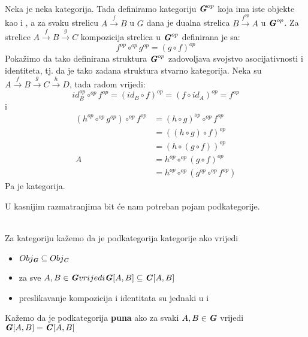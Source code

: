 	\begin{example}\ \\
	
    \noindent Neka je  neka kategorija. Tada definiramo kategoriju $\textbf{\emph{G}}^{op}$ koja ima
    iste objekte kao i , a za svaku strelicu $A \xrightarrow{f} B$ u $G$ 
    dana je dualna strelica $B \xrightarrow{f^{op}} A$ u $\textbf{\emph{G}}^{op}$.
    Za strelice $A \xrightarrow{f} B \xrightarrow{g} C$ kompozicija strelica
    u $\textbf{\emph{G}}^{op}$ definirana je sa:
    \begin{equation*}
      f^{op} \circ^{op} g^{op} = (g \circ f)^{op}
    \end{equation*}
    Pokažimo da tako definirana struktura $\textbf{\emph{G}}^{op}$ zadovoljava svojstvo
    asocijativnosti i identiteta, tj. da je tako zadana struktura stvarno
    kategorija.
    Neka su $A \xrightarrow{f} B \xrightarrow{g} C \xrightarrow{h} D$, tada radom vrijedi:
    \begin{equation*}
      id^{op}_B \circ^{op} f^{op} = (id_B \circ f)^{op} = (f \circ id_A)^{op} =
      f^{op}
    \end{equation*}
    i
    \begin{align*}
      (h^{op} \circ^{op} g^{op}) \circ^{op} f^{op} &= (h \circ g)^{op} \circ^{op} f^{op}\\
      &= ((h \circ g) \circ f)^{op}\\
      &= (h \circ (g \circ f))^{op}\\
      A
      &= h^{op} \circ^{op} (g \circ f)^{op}\\
      &= h^{op} \circ^{op} (g^{op} \circ^{op} f^{op})
    \end{align*}
    Pa je  kategorija.\\
\end{example}

\noindent U kasnijim razmatranjima bit će nam potreban pojam podkategorije.\\

  \begin{definition}\ \\
  
   \noindent Za kategoriju  kažemo da je podkategorija kategorije
     ako vrijedi
    \begin{itemize}
      \item $Obj_{\textbf{\emph{G}}} \subseteq Obj_{\textbf{\emph{C}}}$
      \item za sve $A, B \in \textbf{\emph{G}} vrijedi \textbf{\emph{G}}[A, B] \subseteq
        \textbf{\emph{C}}[A, B]$
      \item preslikavanje kompozicija i identitata su jednaki u  i 
    \end{itemize}
    Kažemo da je podkategorija  \textbf{puna} ako za svaki $A, B \in \textbf{\emph{G}}$ vrijedi
    $\textbf{\emph{G}}[A, B] = \textbf{\emph{C}}[A, B]$\\
    
  \end{definition}
  
